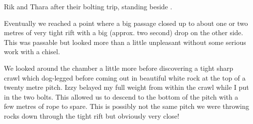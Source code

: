 \begin{marginfigure}
\caption{Rik and Thara after their bolting trip, standing beside . }
\end{marginfigure}


Eventually we reached a point where a big passage closed up to about one
or two metres of very tight rift with a big (approx. two second) drop on
the other side. This was passable but looked more than a little
unpleasant without some serious work with a chisel.

We looked around the chamber a little more before discovering a tight
sharp crawl which dog-legged before coming out in beautiful white rock
at the top of a twenty metre pitch. Izzy belayed my full weight from
within the crawl while I put in the two bolts. This allowed us to
descend to the bottom of the pitch with a few metres of rope to spare.
This is possibly not the same pitch we were throwing rocks down through
the tight rift but obviously very close!

